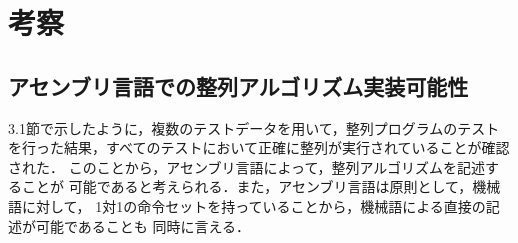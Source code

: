 \documentclass[a4j]{jarticle}
\begin{document}
\section{考察}
\subsection{アセンブリ言語での整列アルゴリズム実装可能性}
3.1節で示したように，複数のテストデータを用いて，整列プログラムのテスト
を行った結果，すべてのテストにおいて正確に整列が実行されていることが確認された．
このことから，アセンブリ言語によって，整列アルゴリズムを記述することが
可能であると考えられる．また，アセンブリ言語は原則として，機械語に対して，
1対1の命令セットを持っていることから，機械語による直接の記述が可能であることも
同時に言える．
\end{document}
